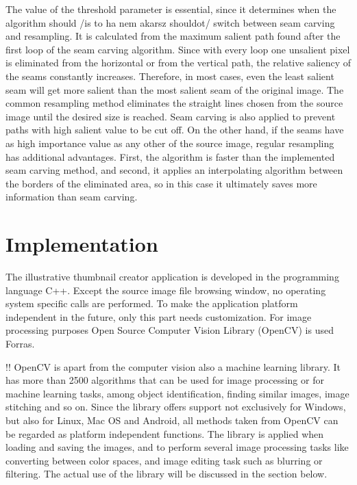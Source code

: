 \documentclass[draft,final]{vutinfth} %
\begin{document}
    The value of the threshold parameter is essential,	since it determines when the algorithm should /is to ha nem akarsz shouldot/ switch between seam carving and resampling. 
	It is calculated from the maximum salient path found after the first loop of the seam carving algorithm.
	Since with every loop one unsalient pixel is eliminated from the horizontal or from the vertical path, the relative saliency of the seams constantly increases.
	Therefore, in most cases, even the least salient seam will get more salient than the most salient seam of the original image. 
	The common resampling method eliminates the straight lines chosen from the source image until the desired size is reached.
	Seam carving is also applied to prevent paths with high salient value to be cut off.
	On the other hand, if the seams have as high importance value as any other of the source image, regular resampling has additional advantages.
	First, the algorithm is faster than the implemented seam carving method, and second, it applies an interpolating algorithm between the borders of the eliminated area, so in this case it ultimately saves more information than seam carving.   
	
	\chapter{Implementation}
	\label{implementation}
	The illustrative thumbnail creator application is developed in the programming language C++.
	Except the source image file browsing window, no operating system specific calls are performed.
	To make the application platform independent in the future, only this part needs customization.
	For image processing purposes Open Source Computer Vision Library (OpenCV) is used Forras.\par 
	!! OpenCV is apart from the computer vision also a machine learning library.     
	It has more than 2500 algorithms that can be used for image processing or for machine learning tasks, among object identification, finding similar images, image stitching and so on.
	Since the library offers support not exclusively for Windows, but also for Linux, Mac OS and Android, all methods taken from OpenCV can be regarded as platform independent functions.
	The library is applied when loading and saving the images, and to perform several image processing tasks like converting between color spaces, and image editing task such as blurring or filtering.
	The actual use of the library will be discussed in the section below.
	
\end{document}
